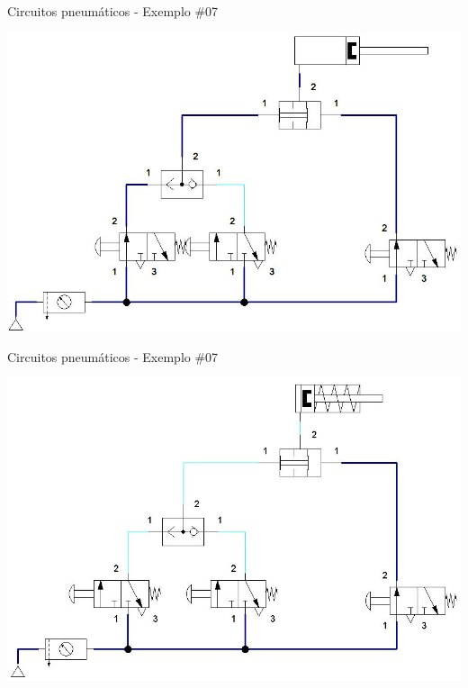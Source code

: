 \begin{frame}{Circuitos pneumáticos - Exemplo \#07}
	
	\centering
	\includegraphics[width=0.9\linewidth]{Figuras/Ch14/fig48n43}
	
\end{frame}


\begin{frame}{Circuitos pneumáticos - Exemplo \#07}
	
	\centering
	\includegraphics[width=0.9\linewidth]{Figuras/Ch14/fig48n44}
	
\end{frame}


